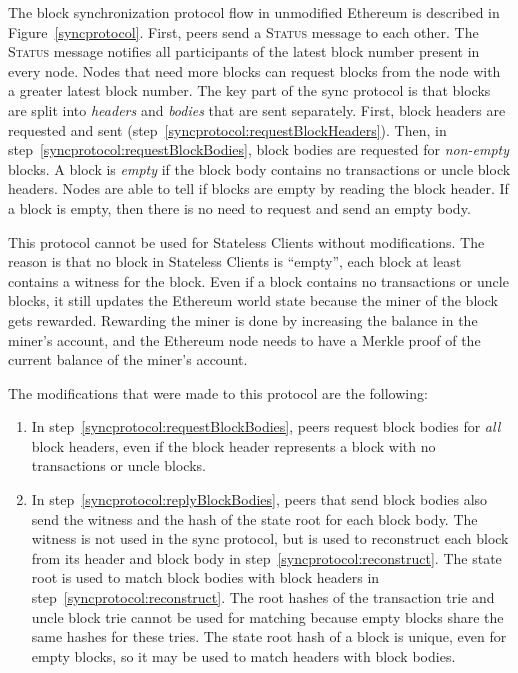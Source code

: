 \documentclass[12pt]{article}
\newcounter{protocol}
\newcommand{\System}{Stateless Clients\xspace}
\begin{document}
The block synchronization protocol flow in unmodified Ethereum is described in Figure~\ref{syncprotocol}. First, peers send a \textsc{Status} message to each other. The \textsc{Status} message notifies all participants of the latest block number present in every node. Nodes that need more blocks can request blocks from the node with a greater latest block number. The key part of the sync protocol is that blocks are split into \emph{headers} and \emph{bodies} that are sent separately. First, block headers are requested and sent (step~\ref{syncprotocol:requestBlockHeaders}). Then, in step~\ref{syncprotocol:requestBlockBodies}, block bodies are requested for \emph{non-empty} blocks. A block is \emph{empty} if the block body contains no transactions or uncle block headers. Nodes are able to tell if blocks are empty by reading the block header. If a block is empty, then there is no need to request and send an empty body.


This protocol cannot be used for \System without modifications. The reason is that no block in \System is ``empty'', each block at least contains a witness for the block. Even if a block contains no transactions or uncle blocks, it still updates the Ethereum world state because the miner of the block gets rewarded. Rewarding the miner is done by increasing the balance in the miner's account, and the Ethereum node needs to have a Merkle proof of the current balance of the miner's account.

The modifications that were made to this protocol are the following:
\begin{enumerate}
  \item In step~\ref{syncprotocol:requestBlockBodies}, peers request block bodies for \emph{all} block headers, even if the block header represents a block with no transactions or uncle blocks.
  \item In step~\ref{syncprotocol:replyBlockBodies}, peers that send block bodies also send the witness and the hash of the state root for each block body. The witness is not used in the sync protocol, but is used to reconstruct each block from its header and block body in step~\ref{syncprotocol:reconstruct}. The state root is used to match block bodies with block headers in step~\ref{syncprotocol:reconstruct}. The root hashes of the transaction trie and uncle block trie cannot be used for matching because empty blocks share the same hashes for these tries. The state root hash of a block is unique, even for empty blocks, so it may be used to match headers with block bodies.
\end{enumerate}
\end{document}
